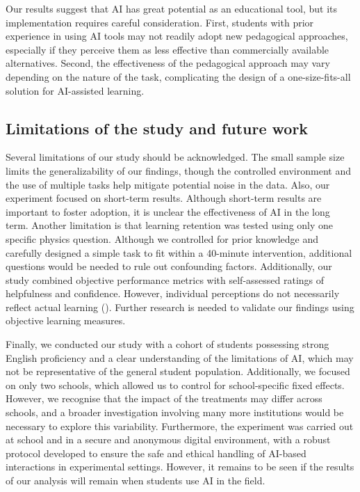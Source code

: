 \documentclass[
  12pt,
]{article}
\begin{document}
Our results suggest that AI has great potential as an educational tool, but its implementation requires careful consideration. First, students with prior experience in using AI tools may not readily adopt new pedagogical approaches, especially if they perceive them as less effective than commercially available alternatives. Second, the effectiveness of the pedagogical approach may vary depending on the nature of the task, complicating the design of a one-size-fits-all solution for AI-assisted learning.

\subsection{Limitations of the study and future work}\label{limitations-of-the-study-and-future-work}

Several limitations of our study should be acknowledged. The small sample size limits the generalizability of our findings, though the controlled environment and the use of multiple tasks help mitigate potential noise in the data. Also, our experiment focused on short-term results. Although short-term results are important to foster adoption, it is unclear the effectiveness of AI in the long term. Another limitation is that learning retention was tested using only one specific physics question. Although we controlled for prior knowledge and carefully designed a simple task to fit within a 40-minute intervention, additional questions would be needed to rule out confounding factors. Additionally, our study combined objective performance metrics with self-assessed ratings of helpfulness and confidence. However, individual perceptions do not necessarily reflect actual learning (). Further research is needed to validate our findings using objective learning measures.

Finally, we conducted our study with a cohort of students possessing strong English proficiency and a clear understanding of the limitations of AI, which may not be representative of the general student population. Additionally, we focused on only two schools, which allowed us to control for school-specific fixed effects. However, we recognise that the impact of the treatments may differ across schools, and a broader investigation involving many more institutions would be necessary to explore this variability. Furthermore, the experiment was carried out at school and in a secure and anonymous digital environment, with a robust protocol developed to ensure the safe and ethical handling of AI-based interactions in experimental settings. However, it remains to be seen if the results of our analysis will remain when students use AI in the field.
\end{document}
